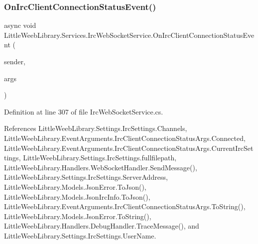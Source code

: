\mbox{\label{class_little_weeb_library_1_1_services_1_1_irc_web_socket_service_abd98810f045f0200700d8441a0c14902}} 
\subsubsection{\texorpdfstring{On\+Irc\+Client\+Connection\+Status\+Event()}{OnIrcClientConnectionStatusEvent()}}
{\footnotesize\ttfamily async void Little\+Weeb\+Library.\+Services.\+Irc\+Web\+Socket\+Service.\+On\+Irc\+Client\+Connection\+Status\+Event (\begin{DoxyParamCaption}\item[{object}]{sender,  }\item[{\mbox{\hyperlink{class_little_weeb_library_1_1_event_arguments_1_1_irc_client_connection_status_args}{Irc\+Client\+Connection\+Status\+Args}}}]{args }\end{DoxyParamCaption})\hspace{0.3cm}{\ttfamily [private]}}



Definition at line 307 of file Irc\+Web\+Socket\+Service.\+cs.



References Little\+Weeb\+Library.\+Settings.\+Irc\+Settings.\+Channels, Little\+Weeb\+Library.\+Event\+Arguments.\+Irc\+Client\+Connection\+Status\+Args.\+Connected, Little\+Weeb\+Library.\+Event\+Arguments.\+Irc\+Client\+Connection\+Status\+Args.\+Current\+Irc\+Settings, Little\+Weeb\+Library.\+Settings.\+Irc\+Settings.\+fullfilepath, Little\+Weeb\+Library.\+Handlers.\+Web\+Socket\+Handler.\+Send\+Message(), Little\+Weeb\+Library.\+Settings.\+Irc\+Settings.\+Server\+Address, Little\+Weeb\+Library.\+Models.\+Json\+Error.\+To\+Json(), Little\+Weeb\+Library.\+Models.\+Json\+Irc\+Info.\+To\+Json(), Little\+Weeb\+Library.\+Event\+Arguments.\+Irc\+Client\+Connection\+Status\+Args.\+To\+String(), Little\+Weeb\+Library.\+Models.\+Json\+Error.\+To\+String(), Little\+Weeb\+Library.\+Handlers.\+Debug\+Handler.\+Trace\+Message(), and Little\+Weeb\+Library.\+Settings.\+Irc\+Settings.\+User\+Name.


